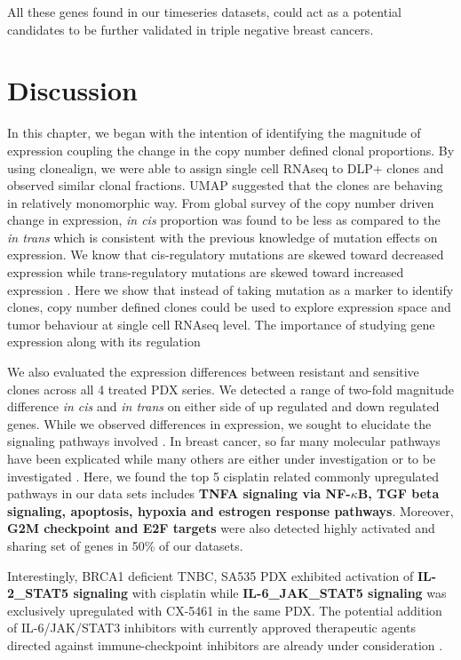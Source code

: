 All these genes found in our timeseries datasets, could act as a potential candidates to be further validated in triple negative breast cancers.


\section{Discussion}

In this chapter, we began with the intention of identifying the magnitude of expression coupling the change in the copy number defined clonal proportions. By using clonealign, we were able to assign single cell RNAseq to  DLP+ clones and observed similar clonal fractions. \ac{UMAP} suggested that the clones are behaving in relatively monomorphic way. From global survey of the copy number driven change in expression, \textit{in cis} proportion was found to be less as compared to the \textit{in trans} which is consistent with the previous knowledge of mutation effects on expression. We know that cis-regulatory mutations are skewed toward decreased expression while trans-regulatory mutations are skewed toward increased expression \cite{metzger2016contrasting}. Here we show that instead of taking mutation as a marker to identify clones, copy number defined clones could be used to explore expression  space and tumor behaviour at single cell RNAseq level. The importance of studying gene expression along with its regulation 

We also evaluated the expression differences between resistant and sensitive clones across all 4 treated PDX series. We detected a range of two-fold magnitude difference \textit{in cis} and \textit{in trans} on either side of up regulated and down regulated genes. While we observed differences in expression, we sought to elucidate the signaling pathways involved . In breast cancer, so far many molecular pathways have been explicated while many others are either under investigation or to be investigated \cite{hanahan2011hallmarks}. Here, we found the top 5 cisplatin related commonly upregulated pathways in our data sets includes \textbf{TNFA signaling via NF-$\kappa$B, TGF  beta  signaling, apoptosis, hypoxia and estrogen response pathways}. Moreover, \textbf{G2M checkpoint and E2F targets} were also detected highly activated and sharing set of genes in 50\% of our datasets. 

Interestingly, BRCA1 deficient TNBC, SA535 PDX exhibited activation of \textbf{IL-2\_STAT5 signaling} with cisplatin while \textbf{IL-6\_JAK\_STAT5 signaling} was exclusively upregulated with CX-5461 in the same PDX. The potential addition of IL-6/JAK/STAT3 inhibitors with currently approved therapeutic agents directed against immune-checkpoint inhibitors are already under consideration \cite{johnson2018targeting}.

